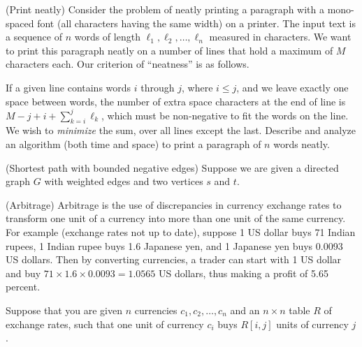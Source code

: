 \newpage
\begin{questions}

  \question[15] (Print neatly) Consider the problem of neatly printing
  a paragraph with a mono-spaced font (all characters having the same
  width) on a printer. The input text is a sequence of $n$ words of
  length $\ell_1,\ell_2,\ldots,\ell_n$ measured in characters. We want
  to print this paragraph neatly on a number of lines that hold a
  maximum of $M$ characters each. Our criterion of ``neatness'' is as
  follows.

  If a given line contains words $i$ through $j$, where $i\le j$, and
  we leave exactly one space between words, the number of extra space
  characters at the end of line is $M - j +i + \sum_{k=i}^j \ell_k$,
  which must be non-negative to fit the words on the line. We wish to
  \emph{minimize} the sum, over all lines except the last. Describe
  and analyze an algorithm (both time and space) to print a paragraph
  of $n$ words neatly. 

  \newpage
  \question (Shortest path with bounded negative edges) Suppose we
  are given a directed graph $G$ with weighted edges and two vertices
  $s$ and $t$.
\newpage
\question (Arbitrage) Arbitrage is the use of discrepancies in
currency exchange rates to transform one unit of a currency into more
than one unit of the same currency. For example (exchange rates not
up to date), suppose 1 US dollar buys 71 Indian rupees, 1 Indian rupee
buys 1.6 Japanese yen, and 1 Japanese yen buys 0.0093 US dollars. Then
by converting currencies, a trader can start with 1 US dollar and buy
$71\times 1.6 \times 0.0093 = 1.0565$ US dollars, thus making a profit
of 5.65 percent.

Suppose that you are given $n$ currencies $c_1,c_2,\ldots,c_n$ and an
$n\times n$ table $R$ of exchange rates, such that one unit of
currency $c_i$ buys $R[i,j]$ units of currency $j$.


\end{questions}
